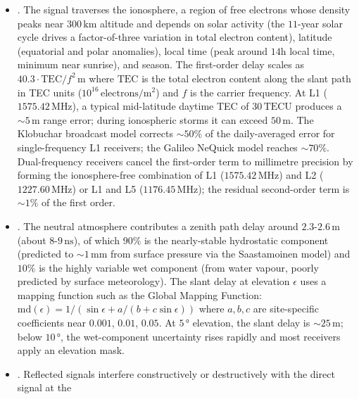 \begin{itemize}[leftmargin=*]
  \item {}. The signal traverses the
    ionosphere, a region of free electrons whose density peaks
    near $300\,\si{\kilo\meter}$ altitude and depends on solar
    activity (the $11$-year solar cycle drives a factor-of-three
    variation in total electron content), latitude (equatorial and
    polar anomalies), local time (peak around $14$h local time,
    minimum near sunrise), and season. The first-order delay
    scales as $40.3 \cdot \text{TEC}/f^{2}\,\si{\meter}$ where
    $\text{TEC}$ is the total electron content along the slant
    path in TEC units ($10^{16}\,\text{electrons}/\si{\meter
    \squared}$) and $f$ is the carrier frequency. At L1
    ($1575.42\,\si{\mega\hertz}$), a typical mid-latitude daytime
    TEC of $30\,\text{TECU}$ produces a $\sim 5\,\si{\meter}$
    range error; during ionospheric storms it can exceed
    $50\,\si{\meter}$. The Klobuchar broadcast model corrects
    $\sim 50\%$ of the daily-averaged error for single-frequency
    L1 receivers; the Galileo NeQuick model reaches $\sim 70\%$.
    Dual-frequency receivers cancel the first-order term to
    millimetre precision by forming the ionosphere-free combination
    of L1 ($1575.42\,\si{\mega\hertz}$) and L2 ($1227.60\,\si{
    \mega\hertz}$) or L1 and L5 ($1176.45\,\si{\mega\hertz}$);
    the residual second-order term is $\sim 1\%$ of the first
    order.
  \item {}. The neutral atmosphere
    contributes a zenith path delay around $2.3$-$2.6\,\si{\meter}$
    (about $8$-$9\,\si{\nano\second}$), of which $90\%$ is the
    nearly-stable hydrostatic component (predicted to $\sim 1\,\si{
    \milli\meter}$ from surface pressure via the Saastamoinen
    model) and $10\%$ is the highly variable wet component (from
    water vapour, poorly predicted by surface meteorology). The
    slant delay at elevation $\epsilon$ uses a mapping function
    such as the Global Mapping Function: $\text{md}(\epsilon) =
    1/(\sin\epsilon + a/(b + c\sin\epsilon))$ where $a, b, c$ are
    site-specific coefficients near $0.001$, $0.01$, $0.05$. At
    $5\,\si{\degree}$ elevation, the slant delay is $\sim 25\,\si{
    \meter}$; below $10\,\si{\degree}$, the wet-component
    uncertainty rises rapidly and most receivers apply an
    elevation mask.
  \item {}. Reflected signals interfere
    constructively or destructively with the direct signal at the

\end{itemize}
